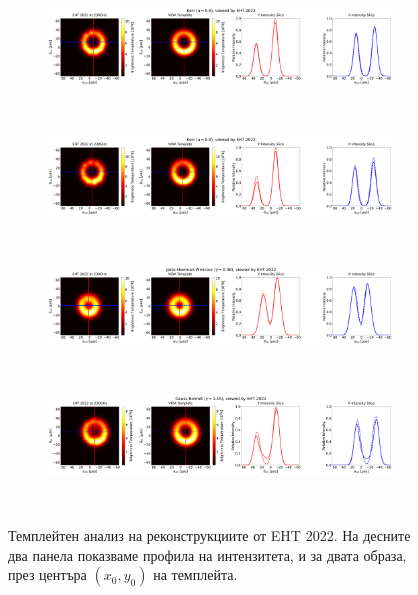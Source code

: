 \begin{figure}[h!]
	\centering
	\begin{subfigure}{12cm}
		\hspace{-1.5cm}
		\includegraphics[scale = 0.13]{Ehtim_Vida_plot_2022_230_Sch.png}
	\end{subfigure}\\
	\begin{subfigure}{12cm}
		\hspace{-1.5cm}
		\includegraphics[scale = 0.13]{Ehtim_Vida_plot_2022_230_Kerr.png}
	\end{subfigure}\\
	\begin{subfigure}{12cm}
		\hspace{-1.5cm}
		\includegraphics[scale = 0.13]{Ehtim_Vida_plot_2022_230_JNW.png}
	\end{subfigure}\\
	\begin{subfigure}{12cm}
		\hspace{-1.5cm}
		\includegraphics[scale = 0.13]{Ehtim_Vida_plot_2022_230_GB.png}
	\end{subfigure}\\
	\label{VIDA_EHT_ng2022}
	\caption[Темплейтен анализ на реконструкциите от EHT 2022]{\small Темплейтен анализ на реконструкциите от EHT 2022. На десните два панела показваме профила на интензитета, и за двата образа, през центъра $(x_0,y_0)$ на темплейта.} 
\end{figure}
\newline

